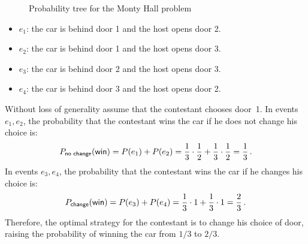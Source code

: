 \documentclass[11pt,a4paper]{article}
\begin{document}
\begin{figure}
\caption{Probability tree for the Monty Hall problem}\label{f.monty-hall}
\end{figure}
\begin{itemize}
\item $e_1$: the car is behind door 1 and the host opens door 2.
\item $e_2$: the car is behind door 1 and the host opens door 3.
\item $e_3$: the car is behind door 2 and the host opens door 3.
\item $e_4$: the car is behind door 3 and the host opens door 2.
\end{itemize}
Without loss of generality assume that the contestant chooses door~1. In events $e_1, e_2$, the probability that the contestant wins the car if he does not change his choice is:
\[
P_{\textsf{\scriptsize no change}}(\textsf{win})=P(e_1)+P(e_2)=\frac{1}{3}\cdot\frac{1}{2}+\frac{1}{3}\cdot\frac{1}{2}=\frac{1}{3}\,.
\]
In events $e_3,e_4$, the probability that the contestant wins the car if he changes his choice is:
\[
P_{\textsf{\scriptsize change}}(\textsf{win})=P(e_3)+P(e_4)=\frac{1}{3}\cdot 1+\frac{1}{3}\cdot 1=\frac{2}{3}\,.
\]
Therefore, the optimal strategy for the contestant is to change his choice of door, raising the probability of winning the car from $1/3$ to $2/3$.
\end{document}
